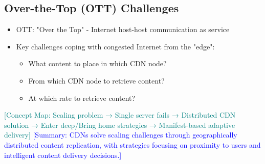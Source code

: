 \documentclass[12pt]{article}
\begin{document}
\subsection{Over-the-Top (OTT) Challenges}
\begin{itemize}
    \item OTT: "Over the Top" - Internet host-host communication as service
    \item Key challenges coping with congested Internet from the "edge":
          \begin{itemize}
              \item What content to place in which CDN node?
              \item From which CDN node to retrieve content?
              \item At which rate to retrieve content?
          \end{itemize}
\end{itemize}

\textcolor{teal}{[Concept Map: Scaling problem → Single server fails → Distributed CDN solution → Enter deep/Bring home strategies → Manifest-based adaptive delivery]}
\textcolor{blue}{[Summary: CDNs solve scaling challenges through geographically distributed content replication, with strategies focusing on proximity to users and intelligent content delivery decisions.]}
\end{document}
